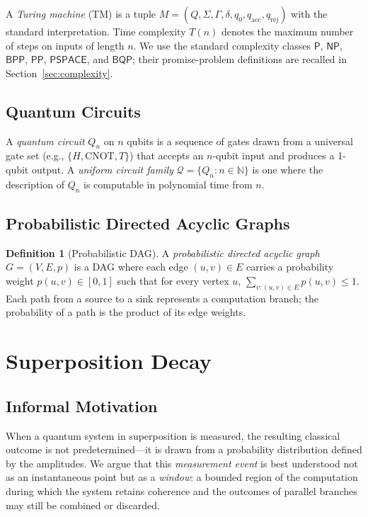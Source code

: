 \documentclass[12pt, a4paper]{article}
\theoremstyle{plain}
\theoremstyle{definition}
\newtheorem{definition}[theorem]{Definition}
\theoremstyle{remark}
\newcommand{\pspace}{\ensuremath{\mathsf{PSPACE}}}
\newcommand{\bqp}{\ensuremath{\mathsf{BQP}}}
\newcommand{\bpp}{\ensuremath{\mathsf{BPP}}}
\newcommand{\pp}{\ensuremath{\mathsf{PP}}}
\newcommand{\Pcls}{\ensuremath{\mathsf{P}}}
\newcommand{\NP}{\ensuremath{\mathsf{NP}}}
\newcommand{\QC}{\ensuremath{\mathcal{Q}}}   %
\newcommand{\Nat}{\mathbb{N}}
\begin{document}
A \emph{Turing machine} (TM) is a tuple $M = (Q, \Sigma, \Gamma, \delta,
q_0, q_{\text{acc}}, q_{\text{rej}})$ with the standard interpretation.
Time complexity $T(n)$ denotes the maximum number of steps on inputs of
length $n$.  We use the standard complexity classes $\Pcls$, $\NP$, $\bpp$,
$\pp$, $\pspace$, and $\bqp$; their promise-problem definitions are recalled
in Section~\ref{sec:complexity}.

\subsection{Quantum Circuits}

A \emph{quantum circuit} $Q_n$ on $n$ qubits is a sequence of gates drawn
from a universal gate set (e.g., $\{H, \mathrm{CNOT}, T\}$) that accepts an
$n$-qubit input and produces a 1-qubit output.  A \emph{uniform circuit
family} $\QC = \{Q_n : n \in \Nat\}$ is one where the description of $Q_n$
is computable in polynomial time from $n$.

\subsection{Probabilistic Directed Acyclic Graphs}

\begin{definition}[Probabilistic DAG]
  A \emph{probabilistic directed acyclic graph} $G = (V, E, p)$ is a DAG
  where each edge $(u, v) \in E$ carries a probability weight
  $p(u,v) \in [0,1]$ such that for every vertex $u$,
  $\sum_{v : (u,v) \in E} p(u,v) \leq 1$.  Each path from a source to a
  sink represents a computation branch; the probability of a path is the
  product of its edge weights.
\end{definition}

\section{Superposition Decay}
\label{sec:sd}

\subsection{Informal Motivation}

When a quantum system in superposition is measured, the resulting classical
outcome is not predetermined---it is drawn from a probability distribution
defined by the amplitudes.  We argue that this \emph{measurement event} is
best understood not as an instantaneous point but as a \emph{window}: a
bounded region of the computation during which the system retains coherence
and the outcomes of parallel branches may still be combined or discarded.
\end{document}
